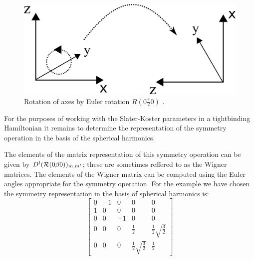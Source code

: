 \begin{figure}[!hbt]
\begin{center}
\includegraphics{./appen/rotateaxes.png}
\caption{Rotation of axes by Euler rotation $R(0\frac{\pi}{2}0)$ \label{fig:rotateaxes}.}
\end{center}
\end{figure}

For the purposes of working with the Slater-Koster parameters in 
a tightbinding Hamiltonian it remains to determine the representation of
the symmetry operation in the basis of the spherical harmonics.

The elements of the matrix representation of this symmetry operation 
can be given by $D^{l}({\mathcal{R}}(0\beta0))_{m,m'}$; these are sometimes reffered to as 
the Wigner matrices. The elements of the Wigner matrix can be computed using the Euler angles
appropriate for the symmetry operation. For the example we have chosen the symmetry representation
in the basis of spherical harmonics is:
%
\begin{equation}
\left[\begin{array}{ccccc}
0  & -1 &  0 & 0 & 0 \\
1  &  0 &  0 & 0 & 0 \\
0  &  0 & -1 & 0 & 0 \\
0  &  0 &  0 & \frac{1}{2} & \frac{1}{2}\sqrt{\frac{3}{2}} \\
0  &  0 &  0 & \frac{1}{2}\sqrt{\frac{3}{2}} & \frac{1}{2}
\end{array}\right]
\end{equation}
%

